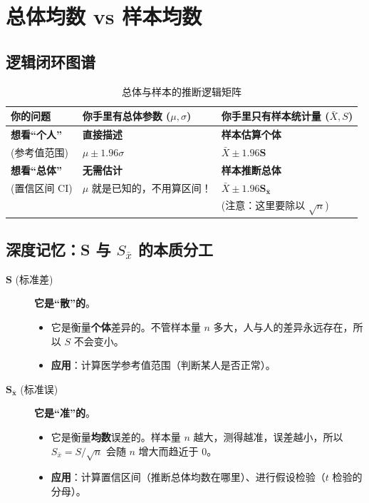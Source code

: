 \documentclass[lang=cn,10pt]{elegantbook}
\begin{document}
\section{总体均数 vs 样本均数}

\subsection{逻辑闭环图谱}

\begin{table}[htbp] %
    \centering
    \caption{总体与样本的推断逻辑矩阵}
    \renewcommand{\arraystretch}{1.5} %
    \begin{tabular}{p{2.5cm}|p{5cm}|p{5cm}}
        \toprule
        \textbf{你的问题} & \textbf{你手里有总体参数 ($\mu, \sigma$)} & \textbf{你手里只有样本统计量 ($\bar{X}, S$)} \\
        \midrule
        \textbf{想看“个人”} & \textbf{直接描述} & \textbf{样本估算个体} \\
        (参考值范围) & $\mu \pm 1.96 \sigma$ & $\bar{X} \pm 1.96 \mathbf{S}$ \\
        \midrule
        \textbf{想看“总体”} & \textbf{无需估计} & \textbf{样本推断总体} \\
        (置信区间 CI) & $\mu$ 就是已知的，不用算区间！ & $\bar{X} \pm 1.96 \mathbf{S_{\bar{x}}}$ \\
         & & \small{(注意：这里要除以 $\sqrt{n}$)} \\
        \bottomrule
    \end{tabular}
\end{table}

\subsection{深度记忆：S 与 $S_{\bar{x}}$ 的本质分工}

\begin{description}
    \item[$\mathbf{S}$ (标准差)] \textbf{它是“散”的}。
    \begin{itemize}
        \item 它是衡量\textbf{个体}差异的。不管样本量 $n$ 多大，人与人的差异永远存在，所以 $S$ 不会变小。
        \item \textbf{应用}：计算医学参考值范围（判断某人是否正常）。
    \end{itemize}

    \item[$\mathbf{S_{\bar{x}}}$ (标准误)] \textbf{它是“准”的}。
    \begin{itemize}
        \item 它是衡量\textbf{均数}误差的。样本量 $n$ 越大，测得越准，误差越小，所以 $S_{\bar{x}} = S/\sqrt{n}$ 会随 $n$ 增大而趋近于 0。
        \item \textbf{应用}：计算置信区间（推断总体均数在哪里）、进行假设检验（$t$ 检验的分母）。~~
    \end{itemize}
\end{description}
\end{document}
